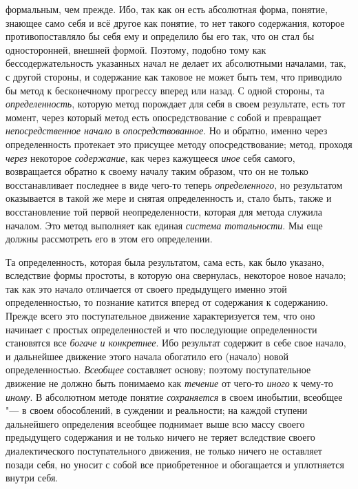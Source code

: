 {{формальным, чем прежде. Ибо, так как он есть абсолютная форма, понятие,
знающее само себя и всё другое как понятие, то нет такого содержания,
которое противопоставляло бы себя ему и определило бы его так, что он стал
бы односторонней, внешней формой. Поэтому, подобно тому как
бессодержательность указанных начал не делает их абсолютными началами, так,
с другой стороны, и содержание как таковое не может быть
тем, что приводило бы метод к бесконечному прогрессу вперед или назад. С
одной стороны, та {\em определенность},
которую метод порождает для себя в своем результате, есть тот
момент, через который метод есть опосредствование с собой и превращает
{\em непосредственное начало} в {\em опосредствованное}.
Но и обратно, именно через определенность протекает это
присущее методу опосредствование; метод, проходя
{\em через} некоторое {\em содержание}, как через кажущееся {\em иное}
себя самого, возвращается обратно к своему началу таким
образом, что он не только восстанавливает последнее в виде чего-то теперь
{\em определенного}, но
результатом оказывается в такой же мере и снятая определенность и, стало
быть, также и восстановление той первой неопределенности, которая для
метода служила началом. Это метод выполняет как единая
{\em система тотальности}.
Мы еще должны рассмотреть его в этом его определении.

Та определенность, которая была результатом, сама есть, как
было указано, вследствие формы простоты, в которую она свернулась,
некоторое новое начало; так как это начало отличается от своего предыдущего
именно этой определенностью, то познание катится вперед от содержания к
содержанию. Прежде всего это поступательное движение характеризуется тем,
что оно начинает с простых определенностей и что последующие определенности
становятся все {\em богаче и
конкретнее}. Ибо результат содержит в себе свое начало, и
дальнейшее движение этого начала обогатило его (начало) новой
определенностью. {\em Всеобщее}
составляет основу; поэтому поступательное движение не должно
быть понимаемо как {\em течение} от чего-то {\em иного} к
чему-то {\em иному}. В абсолютном методе понятие {\em сохраняется} в своем
инобытии, всеобщее "--- в своем обособлений, в суждении и
реальности; на каждой ступени дальнейшего определения всеобщее поднимает
выше всю массу своего предыдущего содержания и не только ничего не теряет
вследствие своего диалектического поступательного движения, не только
ничего не оставляет позади себя, но уносит с собой все приобретенное и
обогащается и уплотняется внутри себя.

}}
